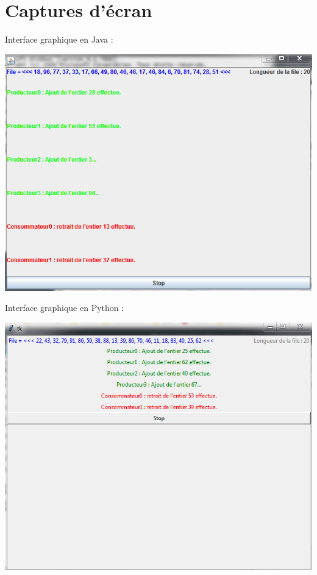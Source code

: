 \documentclass{article}
\begin{document}
\cleardoublepage

\section{Captures d'écran}
\label{section:capture}

Interface graphique en Java :
\begin{center}
  \includegraphics[scale=0.8]{java.PNG}
\end{center}

\cleardoublepage
Interface graphique en Python\cite{tkinterOpenClassroom} :
\begin{center}
  \includegraphics[scale=0.8]{python.PNG}
\end{center}
\end{document}
